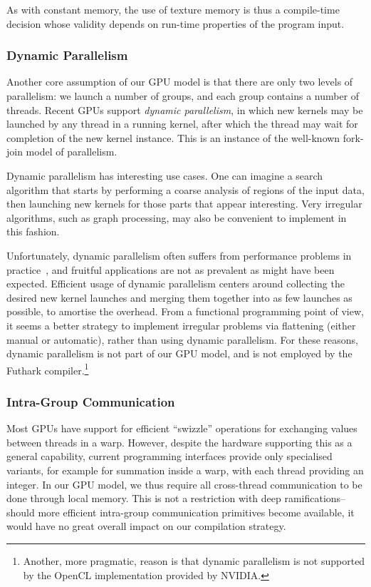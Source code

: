 \begin{description}
  As with constant memory, the use of texture memory is thus a
  compile-time decision whose validity depends on run-time properties
  of the program input.
\end{description}

\subsubsection{Dynamic Parallelism}

Another core assumption of our GPU model is that there are only two
levels of parallelism: we launch a number of groups, and each group
contains a number of threads.  Recent GPUs support \textit{dynamic
  parallelism}, in which new kernels may be launched by any thread in
a running kernel, after which the thread may wait for completion of
the new kernel instance.  This is an instance of the well-known
fork-join model of parallelism.

Dynamic parallelism has interesting use cases.  One can imagine a
search algorithm that starts by performing a coarse analysis of
regions of the input data, then launching new kernels for those parts
that appear interesting.  Very irregular algorithms, such as graph
processing, may also be convenient to implement in this fashion.

Unfortunately, dynamic parallelism often suffers from performance
problems in
practice~\cite{dimarco2013performance,wang2014characterization}, and
fruitful applications are not as prevalent as might have been
expected.  Efficient usage of dynamic parallelism centers around
collecting the desired new kernel launches and merging them together
into as few launches as possible, to amortise the overhead.  From a
functional programming point of view, it seems a better strategy to
implement irregular problems via flattening (either manual or
automatic), rather than using dynamic parallelism.  For these reasons,
dynamic parallelism is not part of our GPU model, and is not employed
by the Futhark compiler.\footnote{Another, more pragmatic, reason is
  that dynamic parallelism is not supported by the OpenCL
  implementation provided by NVIDIA.}

\subsubsection{Intra-Group Communication}

Most GPUs have support for efficient ``swizzle'' operations for
exchanging values between threads in a warp.  However, despite the
hardware supporting this as a general capability, current programming
interfaces provide only specialised variants, for example for
summation inside a warp, with each thread providing an integer.  In
our GPU model, we thus require all cross-thread communication to be
done through local memory.  This is not a restriction with deep
ramifications--should more efficient intra-group communication
primitives become available, it would have no great overall impact on
our compilation strategy.


